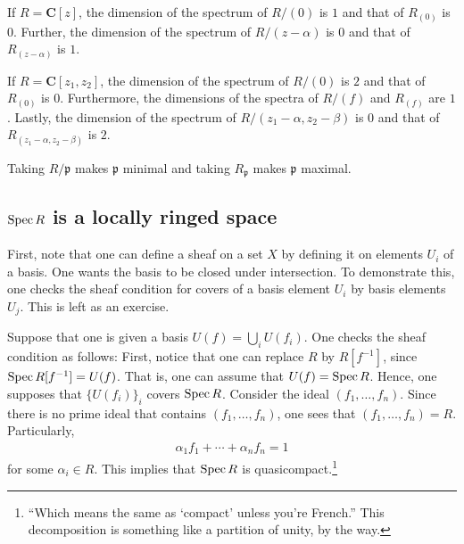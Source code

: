 \documentclass [11 pt, oneside] {article}
\begin{document}
\begin{remark}
	If $R=\mathbf{C}[z]$, the dimension of the spectrum of $R/(0)$ is $1$ and that of $R_{(0)}$ is $0$. Further, the dimension of the spectrum of $R/(z-\alpha)$ is $0$ and that of $R_{(z-\alpha) }$ is $1$.

	If $R=\mathbf{C}[z_1,z_2]$, the dimension of the spectrum of $R/(0)$ is $2$ and that of $R_{(0)}$ is $0$. Furthermore, the dimensions of the spectra of $R/(f)$ and $R_{(f)}$ are $1$. Lastly, the dimension of the spectrum of $R/(z_1-\alpha, z_2-\beta)$ is $0$ and that of $R_{(z_1-\alpha,z_2-\beta)}$ is $2$. 
\end{remark}

\begin{remark}
	Taking $R/\mathfrak{p}$ makes $\mathfrak{p}$ minimal and taking $R_{\mathfrak{p}}$ makes $\mathfrak{p}$ maximal.
\end{remark}

\subsection[The spectrum is a locally ringed space]{$\operatorname{Spec} R$ is a locally ringed space}
First, note that one can define a sheaf on a set $X$ by defining it on elements $U_i$ of a basis. One wants the basis to be closed under intersection. To demonstrate this, one checks the sheaf condition for covers of a basis element $U_i$ by basis elements $U_j$. This is left as an exercise.

Suppose that one is given a basis $U(f) = \bigcup_ i U(f_i)$. One checks the sheaf condition as follows: First, notice that one can replace $R$ by $R[f^{-1}]$, since $\operatorname{Spec} R[f^{-1}]= U(f)$. That is, one can assume that $U(f) = \operatorname{Spec} R$. Hence, one supposes that $\{U(f_i)\}_i$ covers $\operatorname{Spec} R$. Consider the ideal $(f_1,\hdots, f_n)$. Since there is no prime ideal that contains $(f_1,\hdots, f_n)$, one sees that $(f_1,\hdots, f_n)=R$. Particularly, 
\begin{align*}
	\alpha_1f_1 + \cdots +\alpha_nf_n = 1
\end{align*}
for some $\alpha_i\in R$. This implies that $\operatorname{Spec} R$ is quasicompact.\footnote{``Which means the same as `compact' unless you're French.'' This decomposition is something like a partition of unity, by the way.}
\end{document}
